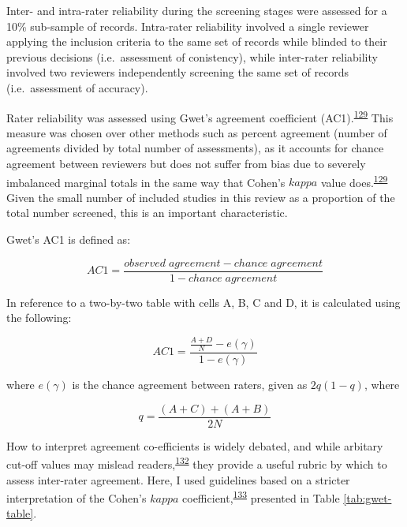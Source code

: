 \documentclass[a4paper, twoside]{templates/ociamthesis}
\begin{document}
Inter- and intra-rater reliability during the screening stages were assessed for a 10\% sub-sample of records. Intra-rater reliability involved a single reviewer applying the inclusion criteria to the same set of records while blinded to their previous decisions (i.e.~assessment of conistency), while inter-rater reliability involved two reviewers independently screening the same set of records (i.e.~assessment of accuracy).

Rater reliability was assessed using Gwet's agreement coefficient (AC1).\textsuperscript{\protect\hyperlink{ref-gwet2008}{129}} This measure was chosen over other methods such as percent agreement (number of agreements divided by total number of assessments), as it accounts for chance agreement between reviewers but does not suffer from bias due to severely imbalanced marginal totals in the same way that Cohen's \(kappa\) value does.\textsuperscript{\protect\hyperlink{ref-gwet2008}{129}} Given the small number of included studies in this review as a proportion of the total number screened, this is an important characteristic.

Gwet's AC1 is defined as:

\[AC1 = \frac{observed\;agreement-chance\;agreement}{1-chance\;agreement}\]

In reference to a two-by-two table with cells A, B, C and D, it is calculated using the following:

\begin{equation}
  AC1 = \frac{\frac{A+D}{N}-e(\gamma)}{1-e(\gamma)}
  \label{eq:AC1-main}
\end{equation}

where \(e(\gamma)\) is the chance agreement between raters, given as \(2q(1-q)\), where

\begin{equation}
  q = \frac{(A+C)+(A+B)}{2N}
  \label{eq:AC1-supp}
\end{equation}

How to interpret agreement co-efficients is widely debated, and while arbitary cut-off values may mislead readers,\textsuperscript{\protect\hyperlink{ref-brennan1992}{132}} they provide a useful rubric by which to assess inter-rater agreement. Here, I used guidelines based on a stricter interpretation of the Cohen's \(kappa\) coefficient,\textsuperscript{\protect\hyperlink{ref-mchugh2012}{133}} presented in Table \ref{tab:gwet-table}.

~
\end{document}
